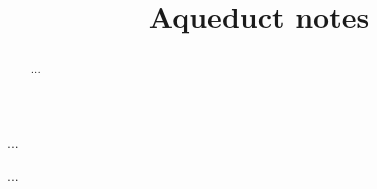 \documentclass[]{siamltex1213}
\title{Aqueduct notes}
\author{
}
\numberwithin{example}{section}
\numberwithin{remark}{section}
\numberwithin{conjecture}{section}
\begin{document}
\renewcommand{\thefootnote}{\fnsymbol{footnote}}
\renewcommand{\thefootnote}{\arabic{footnote}}

\maketitle
{}

\begin{abstract}
  ...
\end{abstract}

\begin{keywords}...\end{keywords}

\begin{AMS}...\end{AMS}

\pagestyle{myheadings}
\thispagestyle{plain}

%

% 
%
%
%
%
\end{document}
